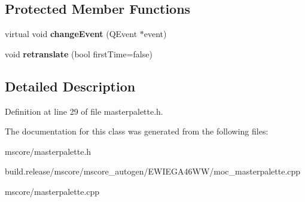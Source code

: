 \subsection*{Protected Member Functions}
\begin{DoxyCompactItemize}
\item 
\mbox{\label{class_ms_1_1_master_palette_afba06de9f49062108db7bc171c2476b4}} 
virtual void {\bfseries change\+Event} (Q\+Event $\ast$event)
\item 
\mbox{\label{class_ms_1_1_master_palette_acd06d93e4cef3efca7338ee49a1d6a54}} 
void {\bfseries retranslate} (bool first\+Time=false)
\end{DoxyCompactItemize}


\subsection{Detailed Description}


Definition at line 29 of file masterpalette.\+h.



The documentation for this class was generated from the following files\+:\begin{DoxyCompactItemize}
\item 
mscore/masterpalette.\+h\item 
build.\+release/mscore/mscore\+\_\+autogen/\+E\+W\+I\+E\+G\+A46\+W\+W/moc\+\_\+masterpalette.\+cpp\item 
mscore/masterpalette.\+cpp\end{DoxyCompactItemize}
